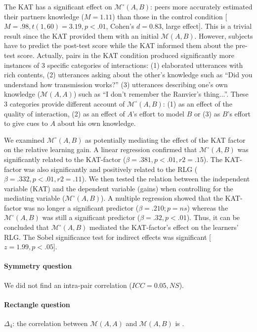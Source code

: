 \documentclass[twocolumn]{article}
\newcommand{\gmodel}[2]{{$\mathcal{M}(#1, #2)$}}
\newcommand{\gModel}[2]{{$\mathcal{M}^{\circ}(#1, #2)$}}
\begin{document}
The KAT has a significant effect on \gModel{A}{B}: peers more accurately
estimated their partners knowledge ($M = 1.11$) than those in the control
condition [$M = .98, t(1, 60) = 3.19, p < .01$, Cohen's $d = 0.83$, large
effect]. This is a trivial result since the KAT provided them with an initial
\gmodel{A}{B}. However, subjects have to predict the post-test score while the
KAT informed them about the pre-test score. Actually, pairs in the KAT condition
produced significantly more instances of 3 specific categories of interactions:
(1) elaborated utterances with rich contents,  (2) utterances asking about the
other's knowledge such as ``Did you understand how transmission works?'' (3)
utterances describing one's own knowledge (\gmodel{A}{A}) such as ``I don't
remember the Ranvier's thing...''. These 3 categories provide different account
of \gModel{A}{B}: (1) as an effect of the quality of interaction, (2) as an
effect of $A$'s effort to model $B$ or (3) as $B$'s effort to give cues to $A$ about his
own knowledge.

We examined \gModel{A}{B} as potentially mediating the effect of the KAT factor
on the relative learning gain. A linear regression confirmed that \gModel{A}{B}
was significantly related to the KAT-factor ($\beta= .381, p < .01, r2 = .15$).
The KAT-factor was also significantly and positively related to the RLG ($\beta=
.332, p < .01, r2 = .11$). We then tested the relation between the independent
variable (KAT) and the dependent variable (gains) when controlling for the
mediating variable (\gModel{A}{B}). A multiple regression showed that the
KAT-factor was no longer a significant predictor ($\beta= .210; p = ns$) whereas
the \gModel{A}{B} was still a significant predictor ($\beta= .32, p < .01$).
Thus, it can be concluded that \gModel{A}{B} mediated the KAT-factor's effect on
the learners' RLG. The Sobel significance test for indirect effects was
significant [$z = 1.99, p < .05$]. 

\paragraph{Symmetry question} We did not find an intra-pair correlation ($ICC =
0.05, NS$).

\paragraph{Rectangle question} $\Delta_4$: the correlation between \gmodel{A}{A} and \gmodel{A}{B} is
.
\end{document}
